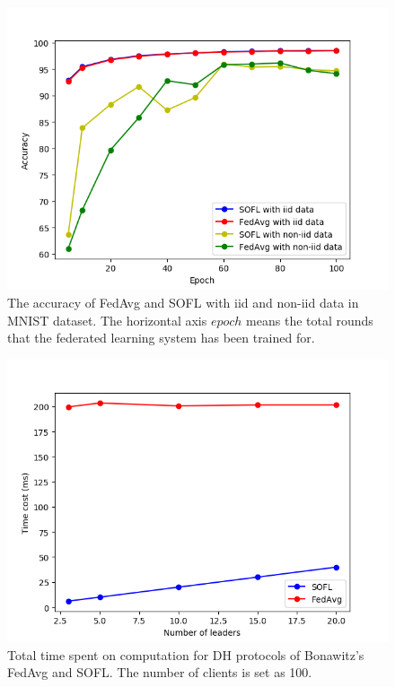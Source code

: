 \begin{figure}[!ht]
    \centering
    \includegraphics[width=\columnwidth]{img/acc.png}
    \caption{The accuracy of FedAvg and SOFL with iid and non-iid data in MNIST dataset. The horizontal axis $epoch$ means the total rounds that the federated learning system has been trained for.}
    \label{acc}
\end{figure}

\begin{figure}[!ht]
    \centering
    \includegraphics[width=\columnwidth]{img/leader-time.png}
    \caption{Total time spent on computation for DH protocols of Bonawitz's FedAvg\cite{Practical} and SOFL. The number of clients is set as 100.}
    \label{leader-time}
\end{figure}

